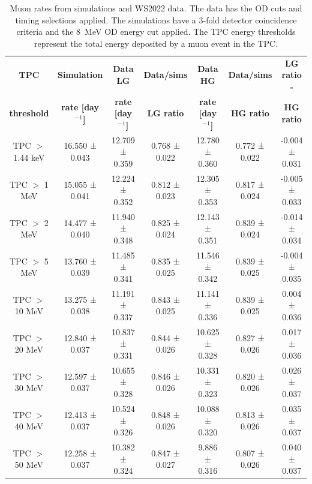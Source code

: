 \begin{center}
\begin{minipage}{\textwidth}
\def\arraystretch{1.4}%
\centering
\begin{longtable}[hbtp]{|c|c|c|c|c|c|c|}
\caption{Muon rates from simulations and WS2022 data. The data has the OD cuts and timing selections applied. The simulations have a 3-fold detector coincidence criteria and the 8~MeV OD energy cut applied. The TPC energy thresholds represent the total energy deposited by a muon event in the TPC.\newline}
\label{tab:Rates2022} \\
\hline
\multicolumn{1}{|c|}{\textbf{TPC}} & \multicolumn{1}{c|}{\textbf{Simulation}} & \multicolumn{1}{c|}{\textbf{Data LG}} & \multicolumn{1}{c|}{\textbf{Data/sims}} & \multicolumn{1}{c|}{\textbf{Data HG}} & \multicolumn{1}{c|}{\textbf{Data/sims}} & \multicolumn{1}{c|}{\textbf{LG ratio - }} \\ 
\multicolumn{1}{|c|}{\textbf{threshold}} & \multicolumn{1}{c|}{\textbf{rate [day$^{-1}$]}} & \multicolumn{1}{c|}{\textbf{rate [day$^{-1}$]}} & \multicolumn{1}{c|}{\textbf{LG ratio}} & \multicolumn{1}{c|}{\textbf{rate [day$^{-1}$]}} & \multicolumn{1}{c|}{\textbf{HG ratio}} & \multicolumn{1}{c|}{\textbf{HG ratio}} \\ \hline 
\endfirsthead \hline
\endlastfoot
TPC $>$ 1.44 keV &  16.550 ± 0.043 &  12.709 ± 0.359 & 0.768 ± 0.022  &  12.780 ± 0.360 & 0.772 ± 0.022  &    -0.004 ± 0.031 \\ \hline
TPC $>$ 1 MeV &  15.055 ± 0.041 &  12.224 ± 0.352 & 0.812 ± 0.023  &  12.305 ± 0.353 & 0.817 ± 0.024  &    -0.005 ± 0.033 \\ \hline
TPC $>$ 2 MeV &  14.477 ± 0.040 &  11.940 ± 0.348 & 0.825 ± 0.024  &  12.143 ± 0.351 & 0.839 ± 0.024  &    -0.014 ± 0.034 \\ \hline
TPC $>$ 5 MeV &  13.760 ± 0.039 &  11.485 ± 0.341 & 0.835 ± 0.025  &  11.546 ± 0.342 & 0.839 ± 0.025  &    -0.004 ± 0.035 \\ \hline
TPC $>$ 10 MeV &  13.275 ± 0.038 &  11.191 ± 0.337 & 0.843 ± 0.025  &  11.141 ± 0.336 & 0.839 ± 0.025  &     0.004 ± 0.036 \\ \hline
TPC $>$ 20 MeV &  12.840 ± 0.037 &  10.837 ± 0.331 & 0.844 ± 0.026  &  10.625 ± 0.328 & 0.827 ± 0.026  &     0.017 ± 0.036 \\ \hline
TPC $>$ 30 MeV &  12.597 ± 0.037 &  10.655 ± 0.328 & 0.846 ± 0.026  &  10.331 ± 0.323 & 0.820 ± 0.026  &     0.026 ± 0.037 \\ \hline
TPC $>$ 40 MeV &  12.413 ± 0.037 &  10.524 ± 0.326 & 0.848 ± 0.026  &  10.088 ± 0.320 & 0.813 ± 0.026  &     0.035 ± 0.037 \\ \hline
TPC $>$ 50 MeV &  12.258 ± 0.037 &  10.382 ± 0.324 & 0.847 ± 0.027  &   9.886 ± 0.316 & 0.807 ± 0.026  &     0.040 ± 0.037 \\
\hline
\end{longtable}
\end{minipage}%
\end{center}

